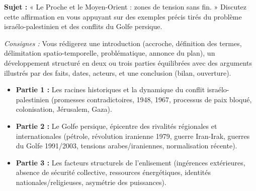 \documentclass[11pt]{article}
\begin{document}
\begin{exercice}
\textbf{Sujet :} « Le Proche et le Moyen-Orient : zones de tension sans fin. » Discutez cette affirmation en vous appuyant sur des exemples précis tirés du problème israélo-palestinien et des conflits du Golfe persique.

\textit{Consignes :} Vous rédigerez une introduction (accroche, définition des termes, délimitation spatio-temporelle, problématique, annonce du plan), un développement structuré en deux ou trois parties équilibrées avec des arguments illustrés par des faits, dates, acteurs, et une conclusion (bilan, ouverture).
\begin{itemize}
    \item \textbf{Partie 1 :} Les racines historiques et la dynamique du conflit israélo-palestinien (promesses contradictoires, 1948, 1967, processus de paix bloqué, colonisation, Jérusalem, Gaza).
    \item \textbf{Partie 2 :} Le Golfe persique, épicentre des rivalités régionales et internationales (pétrole, révolution iranienne 1979, guerre Iran-Irak, guerres du Golfe 1991/2003, tensions arabes/iraniennes, normalisation récente).
    \item \textbf{Partie 3 :} Les facteurs structurels de l'enlisement (ingérences extérieures, absence de sécurité collective, ressources énergétiques, identités nationales/religieuses, asymétrie des puissances).
\end{itemize}
\end{exercice}
\end{document}
